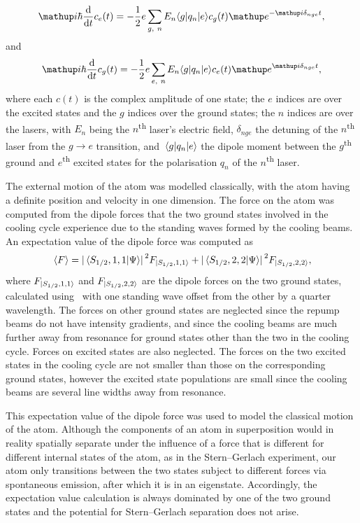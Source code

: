 \begin{equation}
\ii\hbar\dv{t} c_e(t) = -\frac12e\sum_{g,\ n} E_n \langle g |  q_n | e \rangle c_g(t) \ee^{-\ii\delta_{nge}t},
\end{equation}
and
\begin{equation}
\ii\hbar\dv{t} c_g(t) = -\frac12e\sum_{e,\ n} E_n \langle g |  q_n | e \rangle c_e(t) \ee^{\ii\delta_{nge}t},
\end{equation}
where each $c(t)$ is the complex amplitude of one state; the $e$ indices are over the excited states and the $g$ indices over the ground states; the $n$ indices are over the lasers, with $E_n$ being the $n$\textsuperscript{th} laser's electric field, $\delta_{nge}$ the detuning of the $n$\textsuperscript{th} laser from the $g\rightarrow e$ transition, and $\matrixel{g}{q_n}{e}$ the dipole moment between the $g$\textsuperscript{th} ground and $e$\textsuperscript{th} excited states for the polarisation $q_n$ of the $n$\textsuperscript{th} laser.

The external motion of the atom was modelled classically, with the atom having a definite position and velocity in one dimension. The force on the atom was computed from the dipole forces that the two ground states involved in the cooling cycle experience due to the standing waves formed by the cooling beams. An expectation value of the dipole force was computed as
\begin{align}
\ev{F} = \abs{\braket{S_{1/2},1, 1}{\Psi}}^2F_{\ket{S_{1/2},1, 1}} + \abs{\braket{S_{1/2}, 2, 2}{\Psi}}^2F_{\ket{S_{1/2},2, 2}},
\end{align}
where $F_{\ket{S_{1/2}, 1, 1}}$ and $F_{\ket{S_{1/2}, 2, 2}}$ are the dipole forces on the two ground states, calculated using~\cite[eqn 3.16, p 33]{metcalf_laser_1999} with one standing wave offset from the other by a quarter wavelength. The forces on other ground states are neglected since the repump beams do not have intensity gradients, and since the cooling beams are much further away from resonance for ground states other than the two in the cooling cycle. Forces on excited states are also neglected. The forces on the two excited states in the cooling cycle are not smaller than those on the corresponding ground states, however the excited state populations are small since the cooling beams are several line widths away from resonance.

This expectation value of the dipole force was used to model the classical motion of the atom. Although the components of an atom in superposition would in reality spatially separate under the influence of a force that is different for different internal states of the atom, as in the Stern--Gerlach experiment, our atom only transitions between the two states subject to different forces via spontaneous emission, after which it is in an eigenstate. Accordingly, the expectation value calculation is always dominated by one of the two ground states and the potential for Stern--Gerlach separation does not arise.

